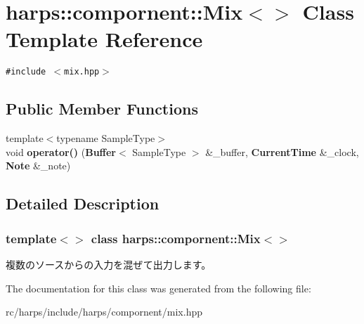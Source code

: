 \section{harps::compornent::Mix$<$$>$ Class Template Reference}
\label{classharps_1_1compornent_1_1Mix}
{\tt \#include $<$mix.hpp$>$}

\subsection*{Public Member Functions}
\begin{CompactItemize}
\item 
{\footnotesize template$<$typename SampleType$>$ }\\void \textbf{operator()} ({\bf Buffer}$<$ SampleType $>$ \&\_\-buffer, {\bf CurrentTime} \&\_\-clock, {\bf Note} \&\_\-note)\label{classharps_1_1compornent_1_1Mix_38faa35f85087729005efa8af7ec0d70}

\end{CompactItemize}


\subsection{Detailed Description}
\subsubsection*{template$<$$>$ class harps::compornent::Mix$<$$>$}

複数のソースからの入力を混ぜて出力します。 

The documentation for this class was generated from the following file:\begin{CompactItemize}
\item 
rc/harps/include/harps/compornent/mix.hpp\end{CompactItemize}
